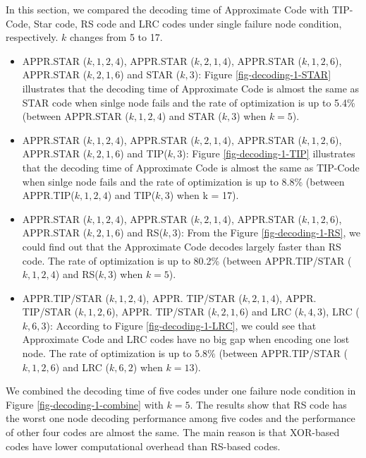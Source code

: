 \documentclass[sigconf]{acmart}
\begin{document}
In this section, we compared the decoding time of Approximate Code with TIP-Code, Star code, RS code and LRC codes under single failure node condition, respectively. $k$ changes from 5 to 17.
\begin{itemize}
    \item APPR.STAR ($k,1,2,4$), APPR.STAR ($k,2,1,4$), APPR.STAR ($k,1,2,6$), APPR.STAR ($k,2,1,6$) and STAR ($k,3$): Figure \ref{fig-decoding-1-STAR} illustrates that the decoding time of Approximate Code is almost the same as STAR code when sinlge node fails and the rate of optimization is up to 5.4\% (between APPR.STAR ($k,1,2,4$) and STAR ($k,3$) when $k = 5$).
    \item APPR.STAR ($k,1,2,4$), APPR.STAR ($k,2,1,4$), APPR.STAR ($k,1,2,6$), APPR.STAR ($k,2,1,6$) and TIP($k,3$): Figure \ref{fig-decoding-1-TIP} illustrates that the decoding time of Approximate Code is almost the same as TIP-Code when sinlge node fails and the rate of optimization is up to 8.8\% (between APPR.TIP($k,1,2,4$) and TIP($k,3$) when k = 17).
    \item APPR.STAR ($k,1,2,4$), APPR.STAR ($k,2,1,4$), APPR.STAR ($k,1,2,6$), APPR.STAR ($k,2,1,6$) and RS($k,3$): From the Figure \ref{fig-decoding-1-RS}, we could find out that the Approximate Code decodes largely faster than RS code. The rate of optimization is up to 80.2\% (between APPR.TIP/STAR ($k,1,2,4$) and RS($k,3$) when $k = 5$).
    \item APPR.TIP/STAR ($k,1,2,4$), APPR. TIP/STAR ($k,2,1,4$), APPR. TIP/STAR ($k,1,2,6$), APPR. TIP/STAR ($k,2,1,6$) and LRC ($k,4,3$), LRC  ($k,6,3$):  According to Figure \ref{fig-decoding-1-LRC}, we could see that Approximate Code and LRC codes have no big gap when encoding one lost node. The rate of optimization is up to $5.8\%$ (between APPR.TIP/STAR ($k,1,2,6$) and LRC ($k, 6, 2$) when $k = 13$).
\end{itemize}

We combined the decoding time of five codes under one failure node condition in Figure \ref{fig-decoding-1-combine} with $k=5$. The results show that RS code has the worst one node decoding performance among five codes and the performance of other four codes are almost the same. The main reason is that XOR-based codes have lower computational overhead than RS-based codes.\par
\end{document}
